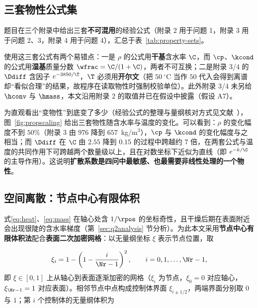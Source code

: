 \subsection{三套物性公式集}
\label{sec:propertysets}

题目在三个附录中给出三套\textbf{不可混用}的经验公式（附录 2 用于问题 1，附录 3 用于问题 2、3，附录 4 用于问题 4），汇总于表~\ref{tab:property-sets}。


使用这三套公式有两个易错点：一是 $\rho$ 的公式用\textbf{干基}含水率 $\C$，而 $\cp$、$\kcond$ 的公式用\textbf{湿基}质量分数 $\wfrac=\C/(1+\C)$，两者不可互换；二是附录 3/4 的 $\Ddiff$ 含因子 $e^{-3850/\T}$，$\T$ 必须用\textbf{开尔文}（把 $50~^\circ$C 当作 $50$ 代入会得到离谱却``看似合理''的结果，故程序在读取物性时强制校验单位）。此外附录 3/4 未另给 $\hconv$ 与 $\hmass$，本文沿用附录 2 的取值并已在假设中披露（假设 A7）。

为直观看出``变物性''到底变了多少（经验公式的整理与量纲核对方式见文献~\cite{mujumdar2015}），图~\ref{fig:propscaling} 给出三套物性随含水率与温度的变化。可以看到：$\rho$ 的变化幅度不到 $50\%$（附录 3 由 $976$ 降到 $657$~kg/m$^3$），$\cp$ 与 $\kcond$ 的变化幅度与之相当；而 $\Ddiff$ 在 $\C$ 由 $2.55$ 降到 $0.15$ 的过程中跨越约 $7$ 倍，在两套公式与温度的共同作用下可跨越两个数量级以上，且在对数坐标下近似为直线（即 $e^{-k/\C}$ 的主导作用）。这说明\textbf{扩散系数是四问中最敏感、也最需要非线性处理的一个物性}。


\subsection{空间离散：节点中心有限体积}
\label{sec:mesh}

式\eqref{eq:heat}、\eqref{eq:mass} 在轴心处含 $1/\rpos$ 的坐标奇性，且干燥后期在表面附近会出现很陡的含水率梯度（第~\ref{sec:q2analysis} 节分析）。为此本文采用\textbf{节点中心有限体积法}\cite{patankar1980}配合\textbf{表面二次加密网格}：以无量纲坐标 $\xi$ 表示节点位置，取

\begin{equation}
\xi_i=1-\left(1-\frac{i}{\Nr-1}\right)^2,
\qquad i=0,1,\ldots,\Nr-1,
\label{eq:gradedmesh}
\end{equation}
即 $\xi\in[0,1]$ 上从轴心到表面逐渐加密的网格（$\xi_i$ 为节点，$\xi_0=0$ 对应轴心，$\xi_{\Nr-1}=1$ 对应表面）。相邻节点中点构成控制体界面 $\xi_{i\pm1/2}$，两端界面分别取 $0$ 与 $1$；第 $i$ 个控制体的无量纲体积为

